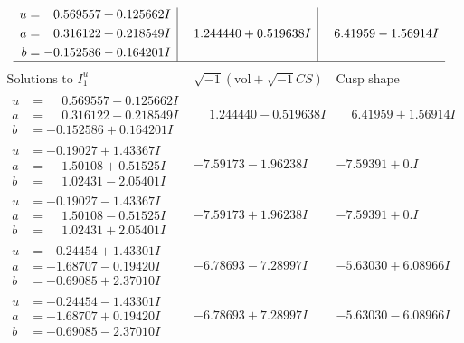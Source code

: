 \documentclass[1p]{elsarticle_modified}
\theoremstyle{definition}
\newcommand{\I}{\sqrt{-1}}
\begin{document}
$$\begin{array}{c|c|c}
\begin{aligned}
u &= \phantom{-}0.569557 + 0.125662 I \\
a &= \phantom{-}0.316122 + 0.218549 I \\
b &= -0.152586 - 0.164201 I\end{aligned}
 & \phantom{-}1.244440 + 0.519638 I & \phantom{-}6.41959 - 1.56914 I\\
 \hline 
 \end{array}$$\newpage$$\begin{array}{c|c|c}  
\text{Solutions to }I^u_{1}& \I (\text{vol} + \sqrt{-1}CS) & \text{Cusp shape}\\
 \hline 
\begin{aligned}
u &= \phantom{-}0.569557 - 0.125662 I \\
a &= \phantom{-}0.316122 - 0.218549 I \\
b &= -0.152586 + 0.164201 I\end{aligned}
 & \phantom{-}1.244440 - 0.519638 I & \phantom{-}6.41959 + 1.56914 I \\ \hline\begin{aligned}
u &= -0.19027 + 1.43367 I \\
a &= \phantom{-}1.50108 + 0.51525 I \\
b &= \phantom{-}1.02431 - 2.05401 I\end{aligned}
 & -7.59173 - 1.96238 I & -7.59391 + 0. I\phantom{ +0.000000I} \\ \hline\begin{aligned}
u &= -0.19027 - 1.43367 I \\
a &= \phantom{-}1.50108 - 0.51525 I \\
b &= \phantom{-}1.02431 + 2.05401 I\end{aligned}
 & -7.59173 + 1.96238 I & -7.59391 + 0. I\phantom{ +0.000000I} \\ \hline\begin{aligned}
u &= -0.24454 + 1.43301 I \\
a &= -1.68707 - 0.19420 I \\
b &= -0.69085 + 2.37010 I\end{aligned}
 & -6.78693 - 7.28997 I & -5.63030 + 6.08966 I \\ \hline\begin{aligned}
u &= -0.24454 - 1.43301 I \\
a &= -1.68707 + 0.19420 I \\
b &= -0.69085 - 2.37010 I\end{aligned}
 & -6.78693 + 7.28997 I & -5.63030 - 6.08966 I \\ \hline\begin{aligned}

\end{aligned}
\end{array}$$
\end{document}
